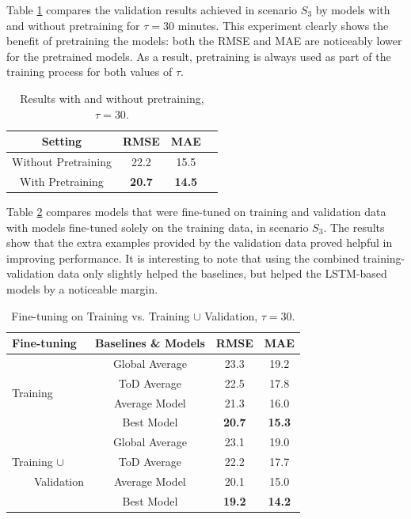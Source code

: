 \documentclass{ecai}
\begin{document}
Table \ref{tab:pretraining} compares the validation results achieved in scenario $S_3$ by models with and without pretraining for $\tau = 30$ minutes. This experiment clearly shows the benefit of pretraining the models: both the RMSE and MAE are noticeably lower for the pretrained models. As a result, pretraining is always used as part of the training process for both values of $\tau$.
\begin{table}
\begin{center}
\caption{Results with and without pretraining, $\tau = 30$.}
\label{tab:pretraining}
\begin{tabular}{|c|c|c|c|}

	\hline
	Setting & RMSE & MAE\\
	\hline
	Without Pretraining & 22.2 & 15.5\\	   				  
	With Pretraining & \textbf{20.7} & \textbf{14.5}\\
	\hline

\end{tabular}
\end{center}
\end{table}

Table \ref{tab:combined} compares models that were fine-tuned on training and validation data with models fine-tuned solely on the training data, in scenario $S_3$. The results show that the extra examples provided by the validation data proved helpful in improving performance. It is interesting to note that using the combined training-validation data only slightly helped the baselines, but helped the LSTM-based models by a noticeable margin.
\begin{table}
\begin{center}
\caption{Fine-tuning on Training vs. Training $\cup$ Validation, $\tau = 30$.}
\label{tab:combined}
\begin{tabular}{|l|c|c|c|}

	\hline
	Fine-tuning & Baselines \& Models & RMSE & MAE\\
	\hline
	\multirow{4}{*}{Training} & Global Average & 23.3 & 19.2\\
							 & ToD Average & 22.5 & 17.8\\
							 \cline{2-4}
							 & Average Model & 21.3 & 16.0\\
							 & Best Model & \textbf{20.7} & \textbf{15.3}\\
	\hline
	& Global Average & 23.1 & 19.0\\
						  Training $\cup$ & ToD Average & 22.2 & 17.7\\
						  \cline{2-4}
						  \ \ \ \ Validation & Average Model & 20.1 & 15.0\\
						  & Best Model & \textbf{19.2} & \textbf{14.2}\\
	\hline			   

\end{tabular}
\end{center}
\end{table}
\end{document}
